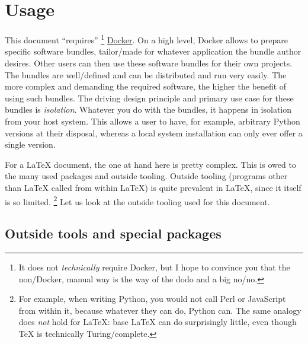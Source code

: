 \chapter{Usage}

This document \enquote{requires}%
\footnote{
    It does not \emph{technically} require Docker, but I hope to convince you that
    the non\-/Docker, manual way is the way of the dodo and a big no\-/no.
}
\href{https://www.docker.com/}{Docker}.
On a high level, Docker allows to prepare specific software bundles, tailor\-/made for
whatever application the bundle author desires.
Other users can then use these software bundles for their own projects.
The bundles are well\-/defined and can be distributed and run very easily.
The more complex and demanding the required software, the higher the benefit of using such bundles.
The driving design principle and primary use case for these bundles is \emph{isolation}.
Whatever you do with the bundles, it happens in isolation from your host system.
This allows a user to have, for example, arbitrary Python versions at their disposal,
whereas a local system installation can only ever offer a single version.

For a \LaTeX{} document, the one at hand here is pretty complex.
This is owed to the many used packages and outside tooling.
Outside tooling (programs other than \LaTeX{} called from within \LaTeX{}) is quite
prevalent in \LaTeX{}, since it itself is so limited.%
\footnote{
    For example, when writing Python, you would not call Perl or JavaScript from within it,
    because whatever they can do, Python can.
    The same analogy does \emph{not} hold for \LaTeX{}: base \LaTeX{} can do surprisingly
    little, even though \TeX{} is technically Turing\-/complete.
}
Let us look at the outside tooling used for this document.

\section{Outside tools and special packages}

